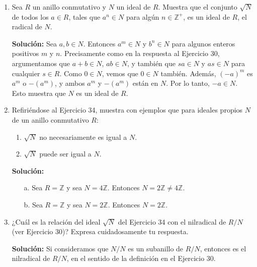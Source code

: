\begin{enumerate}
\item Sea $R$ un anillo conmutativo y $N$ un ideal de $R$. Muestra que el conjunto $\sqrt{N}$ de todos los $a \in R$, tales que $a^{n} \in N$ para algún $n \in \mathbb{Z}^{+}$, es un ideal de $R$, el radical de $N$.

\textbf{Solución:}
 Sea $a, b \in N$. Entonces $a^{m} \in N$ y $b^{n} \in N$ para algunos enteros positivos $m$ y $n$. Precisamente como en la respuesta al Ejercicio 30, argumentamos que $a + b \in N$, $ab \in N$, y también que $sa \in N$ y $as \in N$ para cualquier $s \in R$. Como $0 \in N$, vemos que $0 \in N$ también. Además, $(-a)^{m}$ es $a^{m}$ o $-(a^{m})$, y ambos $a^{m}$ y $-(a^{m})$ están en $N$. Por lo tanto, $-a \in N$. Esto muestra que $N$ es un ideal de $R$.

\item Refiriéndose al Ejercicio 34, muestra con ejemplos que para ideales propios $N$ de un anillo conmutativo $R$:
\begin{enumerate}
    \item $\sqrt{N}$ no necesariamente es igual a $N$.
    \item $\sqrt{N}$ puede ser igual a $N$.
\end{enumerate}

\textbf{Solución:}
\begin{enumerate}
    \item[a.] Sea $R = \mathbb{Z}$ y sea $N = 4\mathbb{Z}$. Entonces $N = 2\mathbb{Z} \neq 4\mathbb{Z}$.
    \item[b.] Sea $R = \mathbb{Z}$ y sea $N = 2\mathbb{Z}$. Entonces $N = 2\mathbb{Z}$.
\end{enumerate}

\item ¿Cuál es la relación del ideal $\sqrt{N}$ del Ejercicio 34 con el nilradical de $R/N$ (ver Ejercicio 30)? Expresa cuidadosamente tu respuesta.

\textbf{Solución:}
Si consideramos que $N/N$ es un subanillo de $R/N$, entonces es el nilradical de $R/N$, en el sentido de la definición en el Ejercicio 30.


\end{enumerate}

